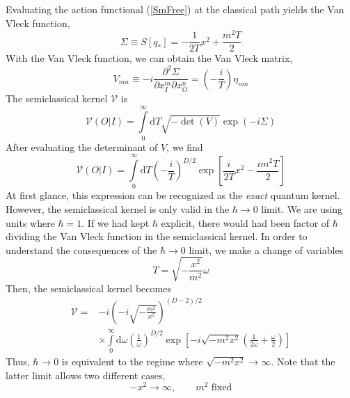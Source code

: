 Evaluating the action functional (\ref{SmFree}) at the classical path yields the Van Vleck function,
\begin{equation}
	\Sigma \equiv S[q_{*}] = - \frac{1}{2 T} x^{2} + \frac{m^{2} T}{2}
\end{equation}
With the Van Vleck function, we can obtain the Van Vleck matrix,
\begin{equation}
	V_{mn} \equiv -i \frac{\partial^{2} \Sigma}{\partial x_{I}^{m} \partial x_{O}^{n}} = \left(- \frac{i}{T} \right) \eta_{mn}
\end{equation}
The semiclassical kernel $\mathcal{V}$ is
\begin{equation}
	\mathcal{V}(O | I) = \int\limits_{0}^{\infty} \mathrm{d}T \sqrt{- \det{(V)}} \exp{\left(- i \Sigma \right)}
\end{equation}
After evaluating the determinant of $V$, we find
\begin{equation}
	\mathcal{V}(O | I) = \int\limits_{0}^{\infty} \mathrm{d}T \left(- \frac{i}{T} \right)^{D/2} \exp{\left[ \frac{i}{2 T} x^{2} - \frac{i m^{2} T}{2} \right]} \label{Vx2}
\end{equation}
At first glance, this expression can be recognized as the \textit{exact} quantum kernel. However, the semiclassical kernel is only valid in the $\hbar \rightarrow 0$ limit. We are using units where $\hbar = 1$. If we had kept $\hbar$ explicit, there would had been factor of $\hbar$ dividing the Van Vleck function in the semiclassical kernel. In order to understand the consequences of the $\hbar \rightarrow 0$ limit, we make a change of variables
\begin{equation}
	T = \sqrt{-\frac{x^{2}}{m^{2}}} \omega
\end{equation}
Then, the semiclassical kernel becomes
\begin{equation}
\begin{split}
	\mathcal{V} = {}&{-i} \left(- i \sqrt{-\frac{m^{2}}{x^{2}}} \right)^{(D - 2)/2} \\
	&\times \int\limits_{0}^{\infty} \mathrm{d}\omega \left( \frac{1}{\omega} \right)^{D/2} \exp{\left[ -i \sqrt{- m^{2} x^{2}} \left( \frac{1}{2 \omega} + \frac{\omega}{2} \right) \right]}
\end{split} \label{VVKernIntegral}
\end{equation}
Thus, $\hbar \rightarrow 0$ is equivalent to the regime where $\sqrt{-m^{2}x^{2}} \rightarrow \infty$. Note that the latter limit allows two different cases,
\begin{equation}
	{-x^{2}} \rightarrow \infty, \qquad m^{2} \text{ fixed} \label{xLarge}
\end{equation}
